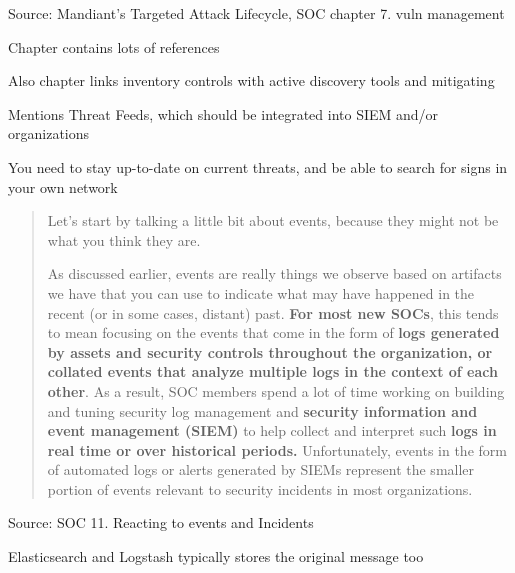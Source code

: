 \documentclass[Screen16to9,17pt]{foils}
\begin{document}
Source: Mandiant’s Targeted Attack Lifecycle, SOC chapter 7. vuln management

\begin{list2}
\item Chapter contains lots of references
\item Also chapter links inventory controls with active discovery tools and mitigating
\item Mentions Threat Feeds, which should be integrated into SIEM and/or organizations
\item You need to stay up-to-date on current threats, and be able to search for signs in your own network
\end{list2}




\begin{quote}
Let’s start by talking a little bit about events, because they might not be what you think they are.

As discussed earlier, events are really things we observe based on artifacts we have that you can use to indicate what may have happened in the recent (or in some cases, distant) past. {\bf For most new SOCs}, this tends to mean focusing on the events that come in the form of {\bf logs generated by assets and security controls throughout the organization, or collated events that analyze multiple logs in the context of each other}. As a result, SOC members spend a lot of time working on building and tuning security log management and {\bf security information and event management (SIEM)} to help collect and interpret such {\bf logs in real time or over historical periods.} Unfortunately, events in the form of automated logs or alerts generated by SIEMs represent the smaller portion of events relevant to security incidents in most organizations.
\end{quote}
Source:  SOC 11. Reacting to events and Incidents

\begin{list2}
\item Elasticsearch and Logstash typically stores the original message too
\end{list2}



\end{document}
